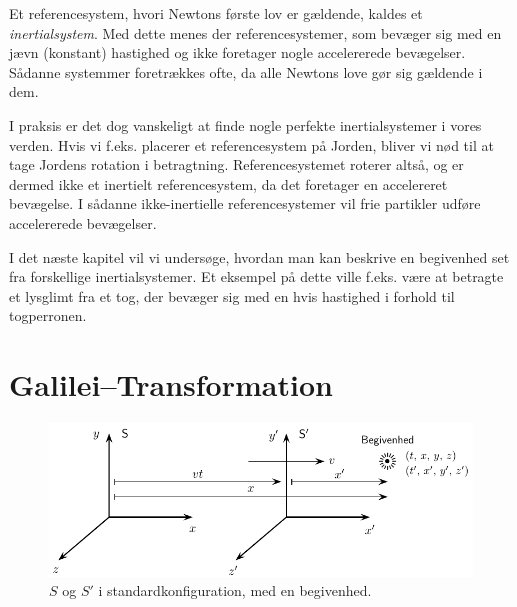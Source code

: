 Et referencesystem, hvori Newtons første lov er gældende, kaldes et \textit{inertialsystem}. Med dette menes der referencesystemer, som bevæger sig med en jævn (konstant) hastighed og ikke foretager nogle accelererede bevægelser. Sådanne systemmer foretrækkes ofte, da alle Newtons love gør sig gældende i dem. 

I praksis er det dog vanskeligt at finde nogle perfekte inertialsystemer i vores verden. Hvis vi f.eks. placerer et referencesystem på Jorden, bliver vi nød til at tage Jordens rotation i betragtning. Referencesystemet roterer altså, og er dermed ikke et inertielt referencesystem, da det foretager en accelereret bevægelse. I sådanne ikke-inertielle referencesystemer vil frie partikler udføre accelererede bevægelser.

I det næste kapitel vil vi undersøge, hvordan man kan beskrive en begivenhed set fra forskellige inertialsystemer. Et eksempel på dette ville f.eks. være at betragte et lysglimt fra et tog, der bevæger sig med en hvis hastighed i forhold til togperronen.

\section{Galilei--Transformation}

\begin{figure}[h!]
	\centering
	\includegraphics[scale=1]{Relativitetsteori/Galilei.pdf}
	\caption{$S$ og $S'$ i standardkonfiguration, med en begivenhed.}
	\label{sr.fig1}
\end{figure}

